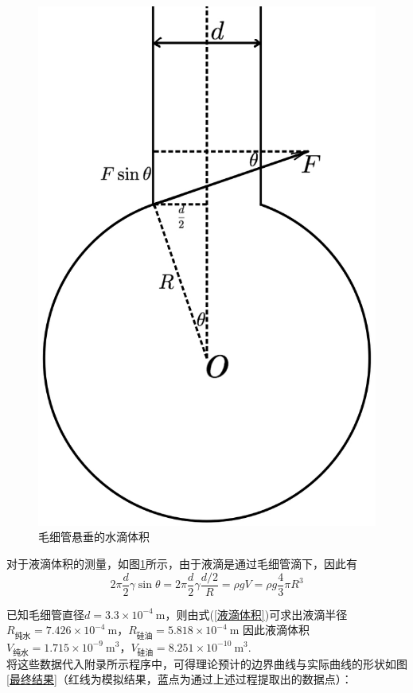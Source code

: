 \documentclass[a4paper,12pt]{article}%
\newcommand{\suo}{\indent}%
\begin{document}
\begin{figure}[H]
    \centering
    \includegraphics[scale=0.2]{图像/毛细管.jpg}
    \caption{毛细管悬垂的水滴体积}\label{96178}
\end{figure}
对于液滴体积的测量，如图\ref{96178}所示，由于液滴是通过毛细管滴下，因此有
\begin{equation}
    2\pi  \frac{d}{2} \gamma\sin \theta=2\pi  \frac{d}{2}\gamma\frac{d/2}{R}=\rho gV=\rho g \frac{4}{3}\pi R^3 \label{液滴体积}
\end{equation}
\begin{spacing}{1.528}%
已知毛细管直径$d=3.3\times 10^{-4}~$m，则由式(\ref{液滴体积})可求出液滴半径$R_\text{纯水}=7.426\times 10^{-4}~$m，$R_\text{硅油}=5.818\times 10^{-4}~$m
因此液滴体积$V_\text{纯水}=1.715\times 10^{-9}~\text{m}^3$，$V_\text{硅油}=8.251\times 10^{-10}~\text{m}^3$. 
\\\suo 将这些数据代入附录所示程序中，可得理论预计的边界曲线与实际曲线的形状如图\ref{最终结果}（红线为模拟结果，蓝点为通过上述过程提取出的数据点）：
\end{spacing}
\end{document}
